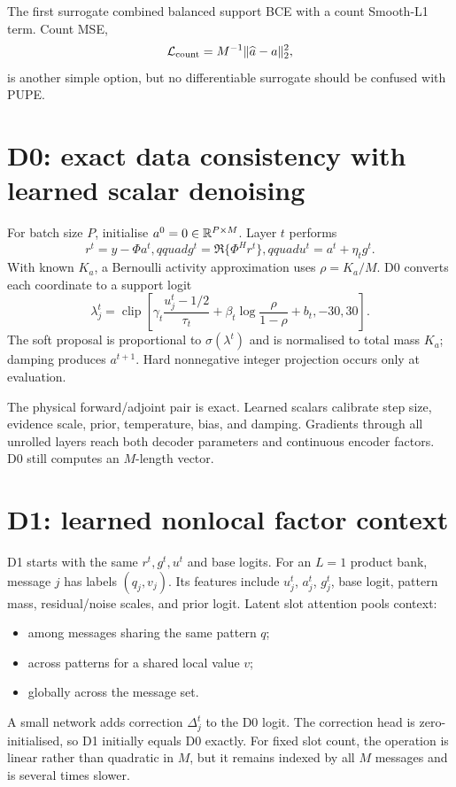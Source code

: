 \documentclass[11pt]{article}
\begin{document}
The first surrogate combined balanced support BCE with a count Smooth-L1 term. Count MSE,
\[
 \mathcal L_{\rm count}=M^{-1}\|\widehat a-a\|_2^2,
\]
is another simple option, but no differentiable surrogate should be confused with PUPE.

\section{D0: exact data consistency with learned scalar denoising}

For batch size $P$, initialise $a^0=0\in\mathbb{R}^{P\times M}$. Layer $t$ performs
\[
 r^t=y-\Phi a^t,qquad
 g^t=\Re\{\Phi^Hr^t\},qquad
 u^t=a^t+\eta_tg^t.
\]
With known $K_a$, a Bernoulli activity approximation uses $\rho=K_a/M$. D0 converts each coordinate to a support logit
\[
 \lambda_j^t=\operatorname{clip}\left[
 \gamma_t\frac{u_j^t-1/2}{\tau_t}+\beta_t\log\frac{\rho}{1-\rho}+b_t,-30,30\right].
\]
The soft proposal is proportional to $\sigma(\lambda^t)$ and is normalised to total mass $K_a$; damping produces
$a^{t+1}$. Hard nonnegative integer projection occurs only at evaluation.

The physical forward/adjoint pair is exact. Learned scalars calibrate step size, evidence scale, prior, temperature,
bias, and damping. Gradients through all unrolled layers reach both decoder parameters and continuous encoder factors.
D0 still computes an $M$-length vector.

\section{D1: learned nonlocal factor context}

D1 starts with the same $r^t,g^t,u^t$ and base logits. For an $L=1$ product bank, message $j$ has labels $(q_j,v_j)$.
Its features include $u_j^t$, $a_j^t$, $g_j^t$, base logit, pattern mass, residual/noise scales, and prior logit. Latent
slot attention pools context:
\begin{itemize}
 \item among messages sharing the same pattern $q$;
 \item across patterns for a shared local value $v$;
 \item globally across the message set.
\end{itemize}
A small network adds correction $\Delta_j^t$ to the D0 logit. The correction head is zero-initialised, so D1 initially
equals D0 exactly. For fixed slot count, the operation is linear rather than quadratic in $M$, but it remains indexed
by all $M$ messages and is several times slower.
\end{document}
